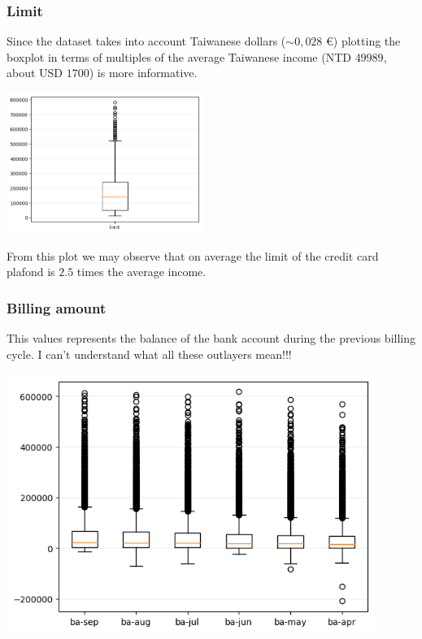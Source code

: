 \documentclass[a4paper]{article}
\begin{document}
\subsubsection{Limit}
Since the dataset takes into account Taiwanese dollars ($\sim 0,028$ €) plotting the boxplot in terms of multiples of the average Taiwanese income (NTD $49989$, about USD $1700$) is more informative.
\begin{center}
\includegraphics[width=0.48\textwidth]{../Code/Gemma/boxplots/limit.png}

\end{center}
From this plot we may observe that on average the limit of the credit card plafond is $2.5$ times the average income.
\subsubsection{Billing amount}
This values represents the balance of the bank account during the previous billing cycle.
I can't understand what all these outlayers mean!!!
\begin{center}
\includegraphics[width=0.9\textwidth]{../Code/Gemma/boxplots/ba.png}
\end{center}
\end{document}
